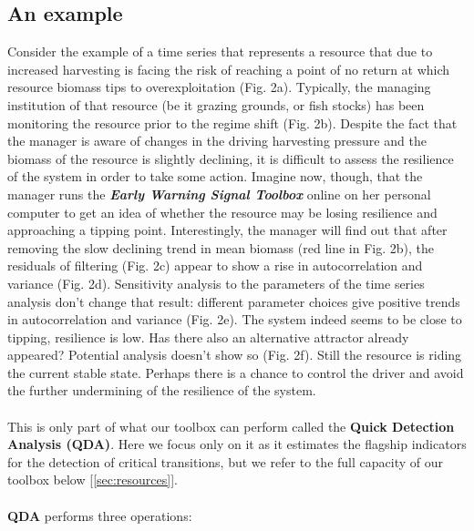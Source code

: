 \documentclass[12pt,a4paper,final]{article}
\begin{document}
\subsection{An example}
Consider the example of a time series that represents a resource that due to increased harvesting is facing the risk of reaching a point of no return at which resource biomass tips to overexploitation (Fig. 2a). Typically, the managing institution of that resource (be it grazing grounds, or fish stocks) has been monitoring the resource prior to the regime shift (Fig. 2b). Despite the fact that the manager is aware of changes in the driving harvesting pressure and the biomass of the resource is slightly declining, it is difficult to assess the resilience of the system in order to take some action. Imagine now, though, that the manager runs the \textbf{\textit{Early Warning Signal Toolbox}} online on her personal computer to get an idea of whether the resource may be losing resilience and approaching a tipping point. Interestingly, the manager will find out that after removing the slow declining trend in mean biomass (red line in Fig. 2b), the residuals of filtering (Fig. 2c) appear to show a rise in autocorrelation and variance (Fig. 2d). Sensitivity analysis to the parameters of the time series analysis don't change that result: different parameter choices give positive trends in autocorrelation and variance (Fig. 2e). The system indeed seems to be close to tipping, resilience is low. Has there also an alternative attractor already appeared? Potential analysis doesn't show so (Fig. 2f). Still the resource is riding the current stable state. Perhaps there is a chance to control the driver and avoid the further undermining of the resilience of the system. 
\\
\\
This is only part of what our toolbox can perform called the \textbf{Quick Detection Analysis (QDA)}. Here we focus only on it as it estimates the flagship indicators for the detection of critical transitions, but we refer to the full capacity of our toolbox below [\ref{sec:resources}].
\\
\\ 
\textbf{QDA} performs three operations:
\end{document}
